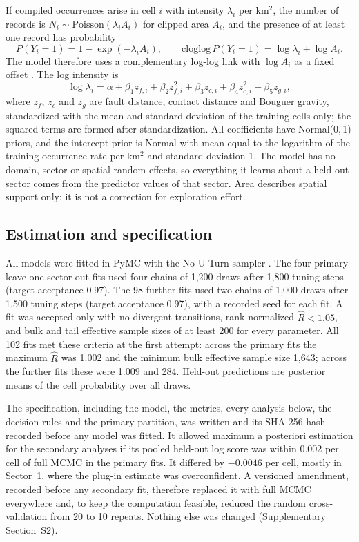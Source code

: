 \documentclass[pdflatex,sn-basic]{sn-jnl}%
\begin{document}
If compiled occurrences arise in cell $i$ with intensity $\lambda_i$ per km$^2$, the number of records is $N_i\sim\mathrm{Poisson}(\lambda_i A_i)$ for clipped area $A_i$, and the presence of at least one record has probability
\begin{equation}
P(Y_i=1)=1-\exp(-\lambda_i A_i),\qquad \mathrm{cloglog}\,P(Y_i=1)=\log\lambda_i+\log A_i .
\end{equation}
The model therefore uses a complementary log-log link with $\log A_i$ as a fixed offset \citep{Baddeley2010, Warton2010}. The log intensity is
\begin{equation}
\log\lambda_i=\alpha+\beta_1 z_{f,i}+\beta_2 z_{f,i}^2+\beta_3 z_{c,i}+\beta_4 z_{c,i}^2+\beta_5 z_{g,i},
\end{equation}
where $z_f$, $z_c$ and $z_g$ are fault distance, contact distance and Bouguer gravity, standardized with the mean and standard deviation of the training cells only; the squared terms are formed after standardization. All coefficients have Normal(0,\,1) priors, and the intercept prior is Normal with mean equal to the logarithm of the training occurrence rate per km$^2$ and standard deviation 1. The model has no domain, sector or spatial random effects, so everything it learns about a held-out sector comes from the predictor values of that sector. Area describes spatial support only; it is not a correction for exploration effort.

\subsection{Estimation and specification}
\label{sec:estimation}

All models were fitted in PyMC \citep{Salvatier2016} with the No-U-Turn sampler \citep{Hoffman2014}. The four primary leave-one-sector-out fits used four chains of 1,200 draws after 1,800 tuning steps (target acceptance 0.97). The 98 further fits used two chains of 1,000 draws after 1,500 tuning steps (target acceptance 0.97), with a recorded seed for each fit. A fit was accepted only with no divergent transitions, rank-normalized $\hat R<1.05$, and bulk and tail effective sample sizes of at least 200 for every parameter. All 102 fits met these criteria at the first attempt: across the primary fits the maximum $\hat R$ was 1.002 and the minimum bulk effective sample size 1,643; across the further fits these were 1.009 and 284. Held-out predictions are posterior means of the cell probability over all draws.

The specification, including the model, the metrics, every analysis below, the decision rules and the primary partition, was written and its SHA-256 hash recorded before any model was fitted. It allowed maximum a posteriori estimation for the secondary analyses if its pooled held-out log score was within 0.002 per cell of full MCMC in the primary fits. It differed by $-0.0046$ per cell, mostly in Sector~1, where the plug-in estimate was overconfident. A versioned amendment, recorded before any secondary fit, therefore replaced it with full MCMC everywhere and, to keep the computation feasible, reduced the random cross-validation from 20 to 10 repeats. Nothing else was changed (Supplementary Section~S2).
\end{document}
